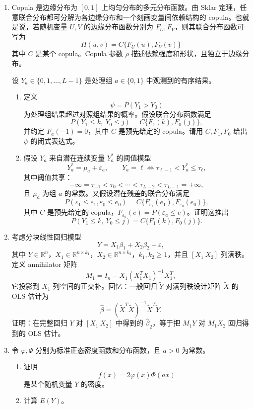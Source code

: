 \documentclass[UTF8,12pt]{ctexart}
\begin{document}
\begin{enumerate}[label=\textbf{\arabic*.},leftmargin=2.2em]
\item Copula 是边缘分布为 \([0,1]\) 上均匀分布的多元分布函数。由 Sklar 定理，任意联合分布都可分解为各边缘分布和一个刻画变量间依赖结构的 copula。也就是说，若随机变量 \(U,V\) 的边缘分布函数分别为 \(F_U,F_V\)，则其联合分布函数可写为
\[
H(u,v)=C\{F_U(u),F_V(v)\}
\]
其中 \(C\) 是某个 copula。Copula 参数 \(\rho\) 描述依赖强度和形状，且独立于边缘分布。

设 \(Y_a\in\{0,1,\ldots,L-1\}\) 是处理组 \(a\in\{0,1\}\) 中观测到的有序结果。
\begin{enumerate}[label=\textbf{(\arabic*)},leftmargin=2.4em]
\item 定义
\[
\psi=P(Y_1>Y_0)
\]
为处理组结果超过对照组结果的概率。假设联合分布函数满足
\[
P(Y_1\le k,\ Y_0\le j)=C\{F_1(k),F_0(j)\},
\]
并约定 \(F_a(-1)=0\)，其中 \(C\) 是预先给定的 copula。请用 \(C,F_1,F_0\) 给出 \(\psi\) 的闭式表达式。
\item 假设 \(Y_a\) 来自潜在连续变量 \(Y_a^\ast\) 的阈值模型
\[
Y_a^\ast=\mu_a+\varepsilon_a,\qquad
Y_a=\ell \Longleftrightarrow \tau_{\ell-1}<Y_a^\ast\le \tau_\ell,
\]
其中阈值共享：
\[
-\infty=\tau_{-1}<\tau_0<\cdots<\tau_{L-2}<\tau_{L-1}=+\infty,
\]
且 \(\mu_a\) 为组 \(a\) 的常数。又假设潜在残差的联合分布满足
\[
P(\varepsilon_1\le e_1,\varepsilon_0\le e_0)
=C\{F_{\varepsilon_1}(e_1),F_{\varepsilon_0}(e_0)\},
\]
其中 \(C\) 是预先给定的 copula，\(F_{\varepsilon_a}(e)=P(\varepsilon_a\le e)\)。证明这推出
\[
P(Y_1\le k,\ Y_0\le j)=C\{F_1(k),F_0(j)\}.
\]
\end{enumerate}

\item 考虑分块线性回归模型
\[
Y=X_1\beta_1+X_2\beta_2+\varepsilon,
\]
其中 \(Y\in\mathbb R^n\)，\(X_1\in\mathbb R^{n\times k_1}\)，\(X_2\in\mathbb R^{n\times k_2}\)，\(k_1,k_2\ge1\)，并且 \([X_1\ X_2]\) 列满秩。定义 annihilator 矩阵
\[
M_1=I_n-X_1(X_1^TX_1)^{-1}X_1^T,
\]
它投影到 \(X_1\) 列空间的正交补。回忆：一般回归 \(\widetilde Y\) 对满列秩设计矩阵 \(\widetilde X\) 的 OLS 估计为
\[
\hat\beta=(\widetilde X^T\widetilde X)^{-1}\widetilde X^T\widetilde Y.
\]
证明：在完整回归 \(Y\) 对 \([X_1\ X_2]\) 中得到的 \(\hat\beta_2\)，等于把 \(M_1Y\) 对 \(M_1X_2\) 回归得到的 OLS 估计。

\item 令 \(\varphi,\Phi\) 分别为标准正态密度函数和分布函数，且 \(a>0\) 为常数。
\begin{enumerate}[label=\textbf{(\alph*)},leftmargin=2.4em]
\item 证明
\[
f(x)=2\varphi(x)\Phi(ax)
\]
是某个随机变量 \(Y\) 的密度。
\item 计算 \(E(Y)\)。
\end{enumerate}


\end{enumerate}
\end{document}
